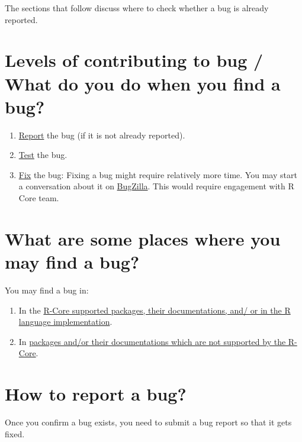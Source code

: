 \documentclass[
]{book}
\begin{document}
The sections that follow discuss where to check whether a bug is already reported.

\hypertarget{levels-of-contributing-to-bug-what-do-you-do-when-you-find-a-bug}{%
\section{Levels of contributing to bug / What do you do when you find a bug?}\label{levels-of-contributing-to-bug-what-do-you-do-when-you-find-a-bug}}

\begin{enumerate}
\def\labelenumi{\arabic{enumi}.}
\item
  \protect\hyperlink{ReportBug}{Report} the bug (if it is not already reported).
\item
  \href{}{Test} the bug.
\item
  \protect\hyperlink{FixBug}{Fix} the bug: Fixing a bug might require relatively more time. You may start a conversation about it on \href{https://bugs.r-project.org/bugzilla/index.cgi}{BugZilla}. This would require engagement with R Core team.
\end{enumerate}

\hypertarget{what-are-some-places-where-you-may-find-a-bug}{%
\section{What are some places where you may find a bug?}\label{what-are-some-places-where-you-may-find-a-bug}}

You may find a bug in:

\begin{enumerate}
\def\labelenumi{\arabic{enumi}.}
\item
  In the \protect\hyperlink{RCorePkgBug}{R-Core supported packages, their documentations, and/ or in the R language implementation}.
\item
  In \protect\hyperlink{nonRCorePkgBug}{packages and/or their documentations which are not supported by the R-Core}.
\end{enumerate}

\hypertarget{ReportBug}{%
\section{How to report a bug?}\label{ReportBug}}

Once you confirm a bug exists, you need to submit a bug report so that it gets fixed.
\end{document}
